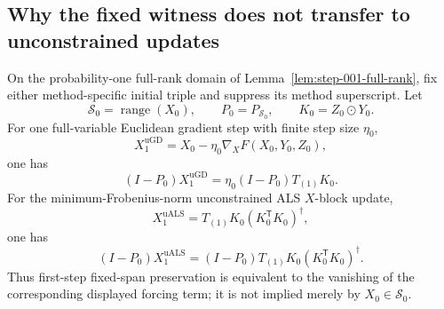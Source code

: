 \subsection{Why the fixed witness does not transfer to unconstrained updates}\label{app:step-006}

\begin{proposition}\label{prop:step-006-first-update}
On the probability-one full-rank domain of
Lemma~\ref{lem:step-001-full-rank}, fix either method-specific initial triple
and suppress its method superscript.  Let
\[
 \mathcal S_0=\operatorname{range}(X_0),
 \qquad P_0=P_{\mathcal S_0},
 \qquad K_0=Z_0\odot Y_0.
\]
For one full-variable Euclidean gradient step with finite step size $\eta_0$,
\[
 X_1^{\mathrm{uGD}}
 =X_0-\eta_0\nabla_XF(X_0,Y_0,Z_0),
\]
one has
\[
 (I-P_0)X_1^{\mathrm{uGD}}
 =\eta_0(I-P_0)T_{(1)}K_0.
 \tag{A.8}\label{eq:step-006-gd-leakage}
\]
For the minimum-Frobenius-norm unconstrained ALS $X$-block update,
\[
 X_1^{\mathrm{uALS}}
 =T_{(1)}K_0(K_0^{\mathsf T}K_0)^\dagger,
\]
one has
\[
 (I-P_0)X_1^{\mathrm{uALS}}
 =(I-P_0)T_{(1)}K_0(K_0^{\mathsf T}K_0)^\dagger.
 \tag{A.9}\label{eq:step-006-als-leakage}
\]
Thus first-step fixed-span preservation is equivalent to the vanishing of the
corresponding displayed forcing term; it is not implied merely by
$X_0\in\mathcal S_0$.
\end{proposition}

